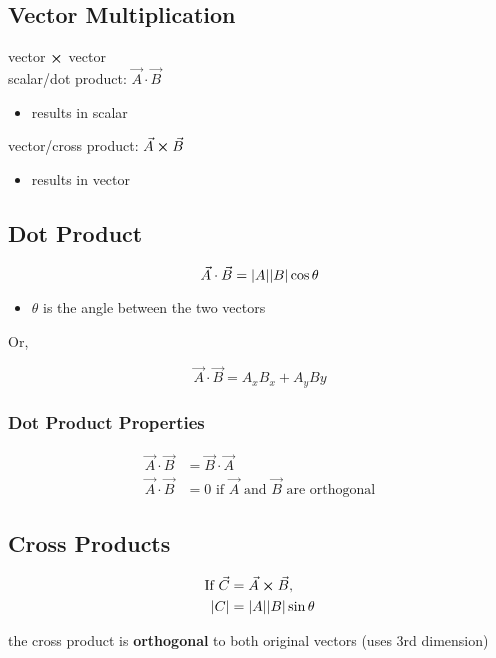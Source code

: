 \documentclass[titlepage]{article}
\begin{document}
\subsection{Vector Multiplication}
vector $\cross$ vector\\

scalar/dot product: $\vec{A} \cdot \vec{B}$
\begin{itemize}
    \item results in scalar
\end{itemize}

vector/cross product: $\vec{A} \cross \vec{B}$
\begin{itemize}
    \item results in vector
\end{itemize}

\subsection{Dot Product}
\[
    \vec{A} \cdot \vec{B} = \abs{A} \abs{B} \cos \theta
\]

\begin{itemize}
    \item $\theta$ is the angle between the two vectors
\end{itemize}

Or,

\[ \vec{A} \cdot \vec{B} = A_xB_x + A_yBy \]

\subsubsection{Dot Product Properties}
\begin{align*}
    \vec{A} \cdot \vec{B} & = \vec{B} \cdot \vec{A}                               \\
    \vec{A} \cdot \vec{B} & = 0 \text{ if $\vec{A}$ and $\vec{B}$ are orthogonal}
\end{align*}

\subsection{Cross Products}
\begin{align*}
    \text{If } \vec{C} & = \vec{A} \cross \vec{B},     \\
    \abs{C}            & = \abs{A} \abs{B} \sin \theta
\end{align*}

the cross product is \textbf{orthogonal} to both original vectors (uses 3rd dimension)
\end{document}

